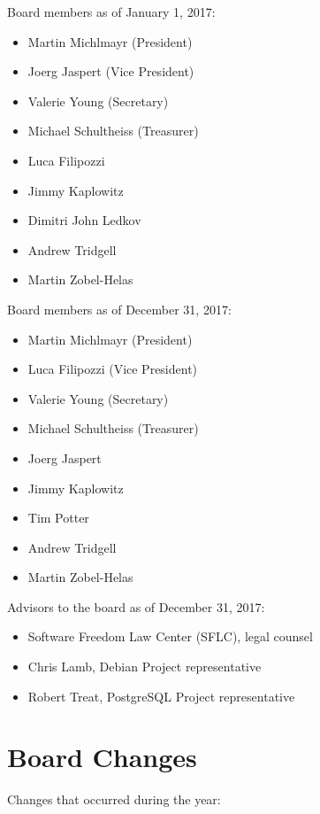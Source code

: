 \documentclass[letterpaper]{report}
\begin{document}
Board members as of January 1, 2017:

\begin{itemize}
\item Martin Michlmayr (President)
\item Joerg Jaspert (Vice President)
\item Valerie Young (Secretary)
\item Michael Schultheiss (Treasurer)
\item Luca Filipozzi
\item Jimmy Kaplowitz
\item Dimitri John Ledkov
\item Andrew Tridgell
\item Martin Zobel-Helas
\end{itemize}

Board members as of December 31, 2017:

\begin{itemize}
\item Martin Michlmayr (President)
\item Luca Filipozzi (Vice President)
\item Valerie Young (Secretary)
\item Michael Schultheiss (Treasurer)
\item Joerg Jaspert
\item Jimmy Kaplowitz
\item Tim Potter
\item Andrew Tridgell
\item Martin Zobel-Helas
\end{itemize}

Advisors to the board as of December 31, 2017:

\begin{itemize}
\item Software Freedom Law Center (SFLC), legal counsel
\item Chris Lamb, Debian Project representative
\item Robert Treat, PostgreSQL Project representative
\end{itemize}

\section{Board Changes}

Changes that occurred during the year:
\end{document}
